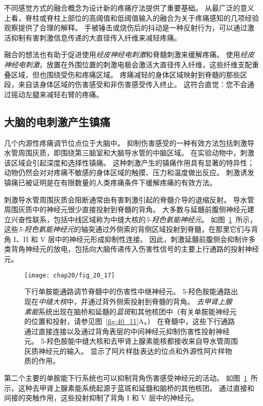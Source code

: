 不同感觉方式的融合概念为设计新的疼痛疗法提供了重要基础。
从最广泛的意义上看，脊柱或脊柱上部位的高阈值和低阈值输入的融合为关于疼痛感知的几项经验观察提供了合理的解释。
手被锤击或烧伤后的抖动是一种反射行为，可以通过激活抑制有害刺激信息传递的大直径传入纤维来减轻疼痛。


融合的想法也有助于促进使用\textit{经皮神经电刺激}和脊髓刺激来缓解疼痛。
使用\textit{经皮神经电刺激}，放置在外围位置的刺激电极会激活大直径传入纤维，这些纤维支配重叠区域，但也围绕受伤和疼痛区域。
疼痛减轻的身体区域映射到脊髓的那些区段，来自该身体区域的伤害感受和非伤害感受传入终止。
这符合直觉：您不会通过摇动左腿来减轻右臂的疼痛。



\subsection{大脑的电刺激产生镇痛}

几个内源性疼痛调节位点位于大脑中。
抑制伤害感受的一种有效方法包括刺激导水管周围灰质，即围绕第三脑室和大脑导水管的中脑区域。
在实验动物中，刺激该区域会引起深度和选择性镇痛。
这种刺激产生的镇痛作用具有显著的特异性；
动物仍然会对对疼痛不敏感的身体区域的触摸、压力和温度做出反应。
刺激诱发镇痛已被证明是在有限数量的人类疼痛条件下缓解疼痛的有效方法。


刺激导水管周围灰质会阻断通常由有害刺激引起的脊髓介导的退缩反射。
导水管周围灰质中的神经元很少直接投射到脊髓的背角。 
大多数与延髓前腹侧神经元建立兴奋性联系，包括中线区域称为中缝大核的\textit{5-羟色氨能神经元}。
如图~\ref{fig:20_17}~所示，这些\textit{5-羟色氨能神经元}的轴突通过外侧索的背侧区域投射到脊髓，在那里它们与背角 I、II 和 V 层中的神经元形成抑制性连接。
因此，刺激延髓前腹侧会抑制许多类背角神经元的放电，包括向大脑传递传入伤害性信号的主要上行通路的投射神经元。


\begin{figure}[htbp]
	\centering
	\texttt{[image: chap20/fig\_20\_17]}
	\caption{下行单胺能通路调节脊髓中的伤害性中继神经元。
		5-羟色胺能通路出现在\textit{中缝大核}中，并通过背外侧索投射到脊髓的背角。
		\textit{去甲肾上腺素能}系统出现在脑桥和延髓的\textit{蓝斑}和其他核团中（有关单胺能神经元的位置和投射，请参见图~\ref{fig:40_11}A。）
		在脊髓中，这些下行通路通过直接连接以及通过背角表层的中间神经元抑制伤害性投射神经元。
		5-羟色胺能中缝大核和去甲肾上腺素能核都接收来自导水管周围灰质神经元的输入。
		显示了阿片样肽表达的位点和外源性阿片样物质的作用。}
	\label{fig:20_17}
\end{figure}


第二个主要的单胺能下行系统也可以抑制背角伤害感受神经元的活动。
如图~\ref{fig:20_17}~所示，这种去甲肾上腺素能系统起源于蓝斑和延髓和脑桥的其他核团。
通过直接和间接的突触作用，这些投射抑制了背角 I 和 V 层中的神经元。




